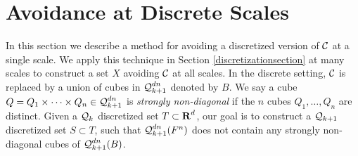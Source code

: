 





\section{Avoidance at Discrete Scales}\label{discretesection}

In this section we describe a method for avoiding a discretized version of $\operatorname{\mathcal{C}}$ at a single scale. We apply this technique in Section \ref{discretizationsection} at many scales to construct a set $X$ avoiding $\operatorname{\mathcal{C}}$ at all scales.
In the discrete setting, $\operatorname{\mathcal{C}}$ is replaced by a union of cubes in $\operatorname{\mathcal{Q}}^{dn}_{k+1}$ denoted by $B$. We say a cube $Q = Q_1 \times \dots \times Q_n \in \operatorname{\mathcal{Q}}^{dn}_{k+1}$ is \emph{strongly non-diagonal} if the $n$ cubes $Q_1, \dots, Q_n$ are distinct. Given a $\operatorname{\mathcal{Q}}_k$ discretized set $T \subset \operatorname{\mathbf{R}}^d$, our goal is to construct a $\operatorname{\mathcal{Q}}_{k+1}$ discretized set $S \subset T$, such that $\operatorname{\mathcal{Q}}_{k+1}^{dn}(F^n)$ does not contain any strongly non-diagonal cubes of $\operatorname{\mathcal{Q}}_{k+1}^{dn}(B)$.


